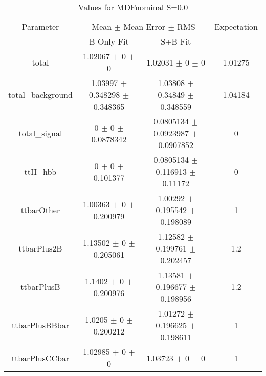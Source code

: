 \begin{table}
\centering
\caption{Values for MDFnominal S=0.0}
\begin{tabular}{cccc}
\toprule
Parameter & \multicolumn{2}{c}{Mean $\pm$ Mean Error $\pm$ RMS} & Expectation\\
 & B-Only Fit & S+B Fit & \\
\midrule
total & \num{1.02067} $\pm$ \num{0} $\pm$ \num{0} & \num{1.02031} $\pm$ \num{0} $\pm$ \num{0} & \num{1.01275}\\
total\_background & \num{1.03997} $\pm$ \num{0.348298} $\pm$ \num{0.348365} & \num{1.03808} $\pm$ \num{0.34849} $\pm$ \num{0.348559} & \num{1.04184}\\
total\_signal & \num{0} $\pm$ \num{0} $\pm$ \num{0.0878342} & \num{0.0805134} $\pm$ \num{0.0923987} $\pm$ \num{0.0907852} & \num{0}\\
ttH\_hbb & \num{0} $\pm$ \num{0} $\pm$ \num{0.101377} & \num{0.0805134} $\pm$ \num{0.116913} $\pm$ \num{0.11172} & \num{0}\\
ttbarOther & \num{1.00363} $\pm$ \num{0} $\pm$ \num{0.200979} & \num{1.00292} $\pm$ \num{0.195542} $\pm$ \num{0.198089} & \num{1}\\
ttbarPlus2B & \num{1.13502} $\pm$ \num{0} $\pm$ \num{0.205061} & \num{1.12582} $\pm$ \num{0.199761} $\pm$ \num{0.202457} & \num{1.2}\\
ttbarPlusB & \num{1.1402} $\pm$ \num{0} $\pm$ \num{0.200976} & \num{1.13581} $\pm$ \num{0.196677} $\pm$ \num{0.198956} & \num{1.2}\\
ttbarPlusBBbar & \num{1.0205} $\pm$ \num{0} $\pm$ \num{0.200212} & \num{1.01272} $\pm$ \num{0.196625} $\pm$ \num{0.198611} & \num{1}\\
ttbarPlusCCbar & \num{1.02985} $\pm$ \num{0} $\pm$ \num{0} & \num{1.03723} $\pm$ \num{0} $\pm$ \num{0} & \num{1}\\
\bottomrule
\end{tabular}
\end{table}